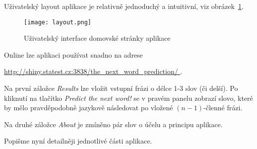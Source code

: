 Uživatelský layout aplikace je relativně jednoduchý a intuitivní, viz
obrázek~\ref{layout_fig}.

\begin{figure}[h]
  \centering
  \texttt{[image: layout.png]}
  \caption{Uživatelský interface domovské stránky aplikace}\label{layout_fig}
\end{figure}

Online lze aplikaci používat snadno na adrese

\begin{center}
  \href{http://shiny.statest.cz:3838/the\_next\_word\_prediction/}{%
    http://shiny.statest.cz:3838/the\_next\_word\_prediction/%
  }.
\end{center}

Na první záložce \textit{Results} lze vložit vstupní frázi o délce 1-3 slov (či delší).
Po kliknutí na tlačítko \textit{Predict the next word!} se v pravém
panelu zobrazí slovo, které by mělo pravděpodobně jazykově následovat
po vložené $(n - 1)$-členné frázi.

Na druhé záložce \textit{About} je zmíněno pár slov o účelu a principu aplikace.

Popišme nyní detailněji jednotlivé části aplikace.

